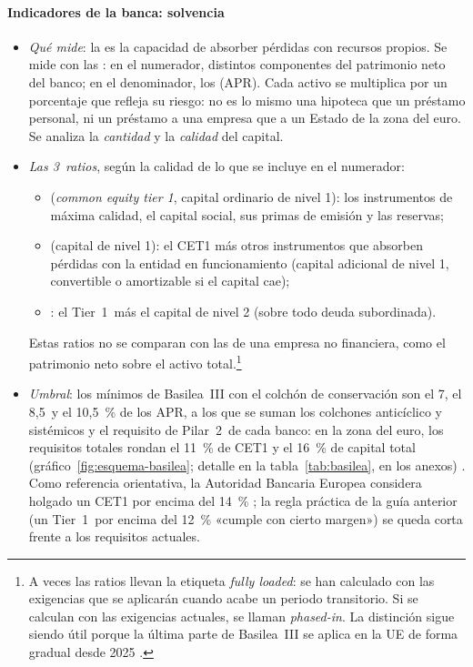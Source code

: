 \documentclass[11pt]{article}
\begin{document}
\paragraph{Indicadores de la banca: solvencia}
\begin{itemize}
\item \emph{Qué mide}: la  es la capacidad de absorber pérdidas con recursos propios. Se mide con las : en el numerador, distintos componentes del patrimonio neto del banco; en el denominador, los  (APR). Cada activo se multiplica por un porcentaje que refleja su riesgo: no es lo mismo una hipoteca que un préstamo personal, ni un préstamo a una empresa que a un Estado de la zona del euro. Se analiza la \emph{cantidad} y la \emph{calidad} del capital.
\item \emph{Las 3~ratios}, según la calidad de lo que se incluye en el numerador:
  \begin{itemize}
  \item {} (\emph{common equity tier 1}, capital ordinario de nivel 1): los instrumentos de máxima calidad, el capital social, sus primas de emisión y las reservas;
  \item {} (capital de nivel 1): el CET1 más otros instrumentos que absorben pérdidas con la entidad en funcionamiento (capital adicional de nivel 1, convertible o amortizable si el capital cae);
  \item {}: el Tier~1~más el capital de nivel 2 (sobre todo deuda subordinada).
  \end{itemize}
  Estas ratios no se comparan con las de una empresa no financiera, como el patrimonio neto sobre el activo total.\footnote{A veces las ratios llevan la etiqueta \emph{fully loaded}: se han calculado con las exigencias que se aplicarán cuando acabe un periodo transitorio. Si se calculan con las exigencias actuales, se llaman \emph{phased-in}. La distinción sigue siendo útil porque la última parte de Basilea~III se aplica en la UE de forma gradual desde 2025 \parencite{RegUE2024CRR3}.}
\item \emph{Umbral}: los mínimos de Basilea~III con el colchón de conservación son el 7, el 8,5~y el 10,5~\% de los APR, a los que se suman los colchones anticíclico y sistémicos y el requisito de Pilar~2~de cada banco: en la zona del euro, los requisitos totales rondan el 11~\% de CET1 y el 16~\% de capital total (gráfico~\ref{fig:esquema-basilea}; detalle en la tabla~\ref{tab:basilea}, en los anexos) \parencite{BCBS2017Basel3,RegUE2013CRR,BCE2025SREP}. Como referencia orientativa, la Autoridad Bancaria Europea considera holgado un CET1 por encima del 14~\% \parencite{ABE2026RiskDashboard}; la regla práctica de la guía anterior (un Tier~1~por encima del 12~\% «cumple con cierto margen») se queda corta frente a los requisitos actuales.

\end{itemize}
\end{document}

